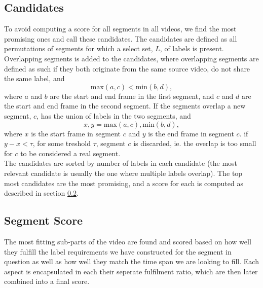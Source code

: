 \subsection{Candidates}\label{sec:candidates}
%
To avoid computing a score for all segments in all videos, we find the most promising ones and call these candidates. The candidates are defined as all permutations of segments for which a select set, $L$, of labels is present.
Overlapping segments is added to the candidates, where overlapping segments are defined as such if they both originate from the same source video, do not share the same label, and 
%
\[
\text{max}(a, c) < \text{min}(b, d),
\]
%
where $a$ and $b$ are the start and end frame in the first segment, and $c$ and $d$ are the start and end frame in the second segment. If the segments overlap a new segment, $c$, has the union of labels in the two segments, and
%
\[
x,y = \text{max}(a, c), \text{min}(b, d),
\]
%
where $x$ is the start frame in segment $c$ and $y$ is the end frame in segment $c$. if $y-x < \tau$, for some treshold $\tau$, segment $c$ is discarded, ie. the overlap is too small for $c$ to be considered a real segment.\\
The candidates are sorted by number of labels in each candidate (the most relevant candidate is usually the one where multiple labels overlap). The top most candidates are the most promising, and a score for each is computed as described in section \ref{sec:segment_score}.
%
%
\subsection{Segment Score}\label{sec:segment_score}
%
%
The most fitting sub-parts of the video are found and scored based on how well they fulfill the label requirements we have constructed for the segment in question as well as how well they match the time span we are looking to fill. Each aspect is encapsulated in each their seperate fulfilment ratio, which are then later combined into a final score.
%
